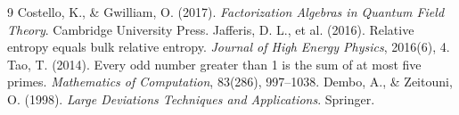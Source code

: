 \documentclass[11pt, a4paper]{article}
\begin{document}
\begin{thebibliography}{9}
 Costello, K., \& Gwilliam, O. (2017). \textit{Factorization Algebras in Quantum Field Theory}. Cambridge University Press.
 Jafferis, D. L., et al. (2016). Relative entropy equals bulk relative entropy. \textit{Journal of High Energy Physics}, 2016(6), 4.
 Tao, T. (2014). Every odd number greater than 1 is the sum of at most five primes. \textit{Mathematics of Computation}, 83(286), 997--1038.
 Dembo, A., \& Zeitouni, O. (1998). \textit{Large Deviations Techniques and Applications}. Springer.
\end{thebibliography}
\end{document}
